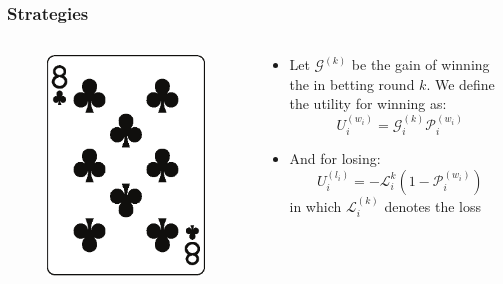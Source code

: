 \documentclass[10pt]{beamer}
\begin{document}
\begin{frame}
\frametitle{Strategies}
 \begin{columns}
  \begin{column}{3cm}
   \begin{figure}
    \includegraphics[width=\linewidth]{im/clubs_8.eps}
   \end{figure}
  \end{column}
  
  \begin{column}{7cm}
    \begin{itemize}[label=$\clubsuit$]
      \item Let $\mathcal G^{(k)}$ be the gain of winning the in betting round $k$. We define the utility for winning as:
     \[
	U_i^{(w_i)} = \mathcal G^{(k)}_i \mathcal P ^{(w_i)}_i
     \]
     \item And for losing:
     \[
	U^{(l_i)}_i = -\mathcal L^{k}_i (1-\mathcal P^{(w_i)}_i)
     \]
     in which $\mathcal L^{(k)}_i$ denotes the loss
    \end{itemize}
  \end{column}
 \end{columns}
\end{frame}
\end{document}
